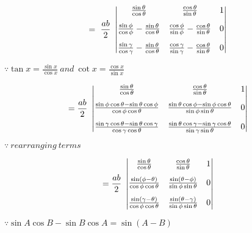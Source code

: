 \documentclass[journal,12pt,twocolumn]{IEEEtran}
\begin{document}
\vspace{0.3cm}
\begin{multline}
=~\frac{ab}{2}~\begin{vmatrix}\vspace{0.3cm}
 \frac{\sin\theta}{\cos\theta} & \frac{\cos\theta}{\sin\theta} & 1  \\ \vspace{0.3cm}
 \frac{\sin\phi}{\cos\phi}-\frac{\sin\theta}{\cos\theta} & \frac{\cos\phi}{\sin\phi}-\frac{\cos\theta}{\sin\theta} & 0  \\
 \frac{\sin\gamma}{\cos\gamma}-\frac{\sin\theta}{\cos\theta} & \frac{\cos\gamma}{\sin\gamma}-\frac{\cos\theta}{\sin\theta} & 0 
\end{vmatrix}\end{multline}
\begin{flushright}
$\because \tan x = \frac{\sin x}{\cos x}~and~\cot x = \frac{\cos x}{\sin x} $
\end{flushright}

\vspace{0.3cm}
\begin{multline}
=\frac{ab}{2}~\begin{vmatrix}\vspace{0.3cm}
 \frac{\sin\theta}{\cos\theta} & \frac{\cos\theta}{\sin\theta} & 1  \\ \vspace{0.3cm}
 \frac{\sin\phi\cos\theta - \sin\theta\cos\phi}{\cos\phi\cos\theta} & \frac{\sin\theta\cos\phi - \sin\phi\cos\theta}{\sin\phi\sin\theta} & 0  \\
  \frac{\sin\gamma\cos\theta - \sin\theta\cos\gamma}{\cos\gamma\cos\theta} & \frac{\sin\theta\cos\gamma - \sin\gamma\cos\theta}{\sin\gamma\sin\theta} & 0
\end{vmatrix}    
\end{multline}
\begin{flushright}
$\because ~rearranging ~terms $
\end{flushright}

\vspace{0.3cm}
\begin{multline}
=\frac{ab}{2}~\begin{vmatrix}\vspace{0.3cm}
 \frac{\sin\theta}{\cos\theta} & \frac{\cos\theta}{\sin\theta} & 1  \\ \vspace{0.3cm}
 \frac{\sin(\phi-\theta)}{\cos\phi\cos\theta} & \frac{\sin(\theta-\phi)}{\sin\phi\sin\theta} & 0  \\
 \frac{\sin(\gamma-\theta)}{\cos\phi\cos\theta} & \frac{\sin(\theta-\gamma)}{\sin\phi\sin\theta} & 0 
\end{vmatrix}    
\end{multline}
\begin{flushright}
$\because \sin A\cos B - \sin B\cos A = \sin(A-B)$
\end{flushright}
\vspace{0.3cm}
\end{document}
